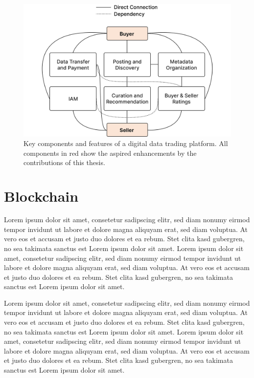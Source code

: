 \begin{figure}[!htb]
    \centering
    \includegraphics[width=13cm]{images/components-clean.png}
    \caption[Key components and features of a digital data trading platform]{Key components and features of a digital data trading platform. All components in red show the aspired enhancements by the contributions of this thesis.}
    \label{fig:components}
\end{figure}

\section{Blockchain}
\label{sec:blockchain}

Lorem ipsum dolor sit amet, consetetur sadipscing elitr, sed diam nonumy eirmod tempor invidunt ut labore et dolore magna aliquyam erat, sed diam voluptua. At vero eos et accusam et justo duo dolores et ea rebum. Stet clita kasd gubergren, no sea takimata sanctus est Lorem ipsum dolor sit amet. Lorem ipsum dolor sit amet, consetetur sadipscing elitr, sed diam nonumy eirmod tempor invidunt ut labore et dolore magna aliquyam erat, sed diam voluptua. At vero eos et accusam et justo duo dolores et ea rebum. Stet clita kasd gubergren, no sea takimata sanctus est Lorem ipsum dolor sit amet.

Lorem ipsum dolor sit amet, consetetur sadipscing elitr, sed diam nonumy eirmod tempor invidunt ut labore et dolore magna aliquyam erat, sed diam voluptua. At vero eos et accusam et justo duo dolores et ea rebum. Stet clita kasd gubergren, no sea takimata sanctus est Lorem ipsum dolor sit amet. Lorem ipsum dolor sit amet, consetetur sadipscing elitr, sed diam nonumy eirmod tempor invidunt ut labore et dolore magna aliquyam erat, sed diam voluptua. At vero eos et accusam et justo duo dolores et ea rebum. Stet clita kasd gubergren, no sea takimata sanctus est Lorem ipsum dolor sit amet.

